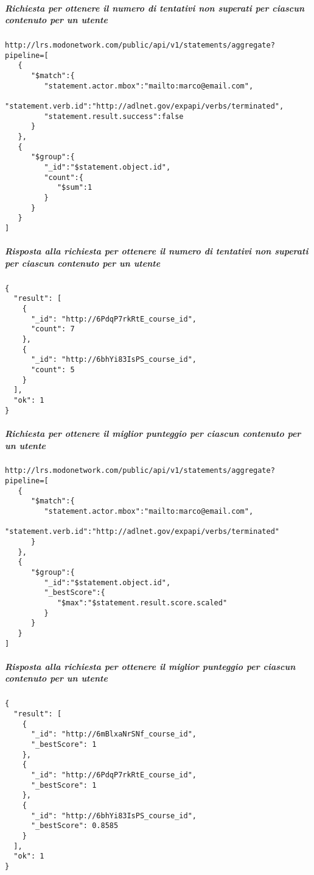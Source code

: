     \subparagraph*{Richiesta per ottenere il numero di tentativi non superati per ciascun contenuto per un utente}\hfill \break
    \begin{lstlisting}
http://lrs.modonetwork.com/public/api/v1/statements/aggregate?pipeline=[
   {
      "$match":{
         "statement.actor.mbox":"mailto:marco@email.com",
         "statement.verb.id":"http://adlnet.gov/expapi/verbs/terminated",
         "statement.result.success":false
      }
   },
   {
      "$group":{
         "_id":"$statement.object.id",
         "count":{
            "$sum":1
         }
      }
   }
]
    \end{lstlisting}
    \subparagraph*{Risposta alla richiesta per ottenere il numero di tentativi non superati per ciascun contenuto per un utente}\hfill \break
    \begin{lstlisting}
{
  "result": [
    {
      "_id": "http://6PdqP7rkRtE_course_id",
      "count": 7
    },
    {
      "_id": "http://6bhYi83IsPS_course_id",
      "count": 5
    }
  ],
  "ok": 1
}
    \end{lstlisting}

    \subparagraph*{Richiesta per ottenere il  miglior punteggio per ciascun contenuto per un utente}\hfill \break
    \begin{lstlisting}
http://lrs.modonetwork.com/public/api/v1/statements/aggregate?pipeline=[
   {
      "$match":{
         "statement.actor.mbox":"mailto:marco@email.com",
         "statement.verb.id":"http://adlnet.gov/expapi/verbs/terminated"
      }
   },
   {
      "$group":{
         "_id":"$statement.object.id",
         "_bestScore":{
            "$max":"$statement.result.score.scaled"
         }
      }
   }
]
    \end{lstlisting}
    \subparagraph*{Risposta alla richiesta per ottenere il  miglior punteggio per ciascun contenuto per un utente}\hfill \break
    \begin{lstlisting}
{
  "result": [
    {
      "_id": "http://6mBlxaNrSNf_course_id",
      "_bestScore": 1
    },
    {
      "_id": "http://6PdqP7rkRtE_course_id",
      "_bestScore": 1
    },
    {
      "_id": "http://6bhYi83IsPS_course_id",
      "_bestScore": 0.8585
    }
  ],
  "ok": 1
}
    \end{lstlisting}

